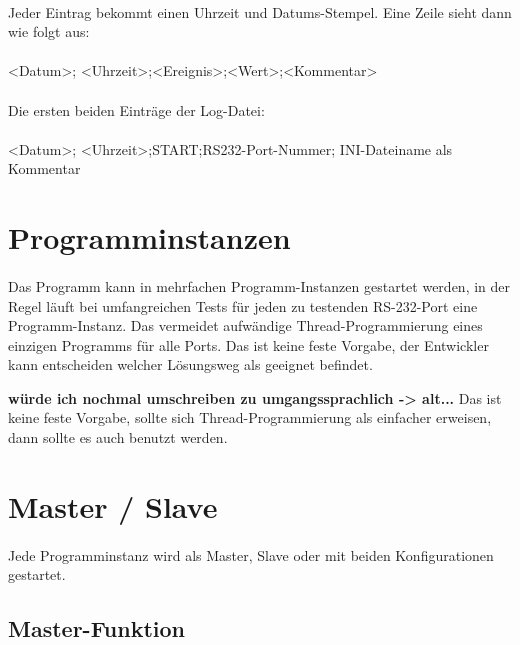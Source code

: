 \paragraph{}
Jeder Eintrag bekommt einen Uhrzeit und Datums-Stempel. Eine Zeile sieht dann wie folgt aus:
\\
\\ \hspace*{10mm} <Datum>; <Uhrzeit>;<Ereignis>;<Wert>;<Kommentar>

\paragraph{}
Die ersten beiden  Einträge der Log-Datei:
\\
\\ \hspace*{10mm} <Datum>; <Uhrzeit>;START;RS232-Port-Nummer; INI-Dateiname als Kommentar



\section{Programminstanzen}
\paragraph{}
Das Programm kann in mehrfachen Programm-Instanzen gestartet werden, in der Regel läuft bei umfangreichen Tests für jeden zu testenden RS-232-Port eine Programm-Instanz. Das vermeidet aufwändige Thread-Programmierung eines einzigen Programms für alle Ports. Das ist keine feste Vorgabe, der Entwickler kann entscheiden welcher Lösungsweg  als geeignet befindet.

\textbf{würde ich nochmal umschreiben zu umgangssprachlich -> alt...} Das ist keine feste Vorgabe, sollte sich Thread-Programmierung als einfacher erweisen, dann sollte es auch benutzt werden.


\section{Master / Slave}
\paragraph{}
Jede Programminstanz wird als Master, Slave oder mit beiden Konfigurationen gestartet.


\subsection{Master-Funktion}
